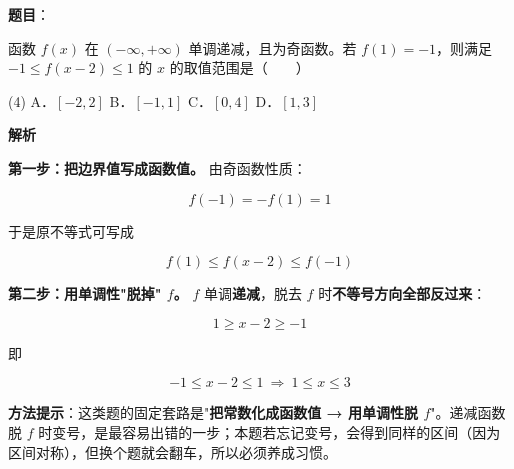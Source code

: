 \begin{answer}

\textbf{题目}：

函数 $f(x)$ 在 $(-\infty,+\infty)$ 单调递减，且为奇函数。若 $f(1)=-1$，则满足 $-1\le f(x-2)\le1$ 的 $x$ 的取值范围是\mbox{（　　）}

\begin{gkopts}(4)
\task A．$[-2,2]$
\task B．$[-1,1]$
\task C．$[0,4]$
\task D．$[1,3]$
\end{gkopts}

\textbf{解析}

\textbf{第一步：把边界值写成函数值。} 由奇函数性质：

\nopagebreak[4]
\[f(-1)=-f(1)=1\]

于是原不等式可写成

\nopagebreak[4]
\[f(1)\le f(x-2)\le f(-1)\]

\textbf{第二步：用单调性"脱掉" $f$。} $f$ 单调\textbf{递减}，脱去 $f$ 时\textbf{不等号方向全部反过来}：

\nopagebreak[4]
\[1\ge x-2\ge-1\]

即

\nopagebreak[4]
\[-1\le x-2\le1\ \Longrightarrow\ 1\le x\le3\]

\begin{gktip}
\textbf{方法提示}：这类题的固定套路是"\textbf{把常数化成函数值 → 用单调性脱 $f$}"。递减函数脱 $f$ 时变号，是最容易出错的一步；本题若忘记变号，会得到同样的区间（因为区间对称），但换个题就会翻车，所以必须养成习惯。
\end{gktip}


\par\medskip

\end{answer}
